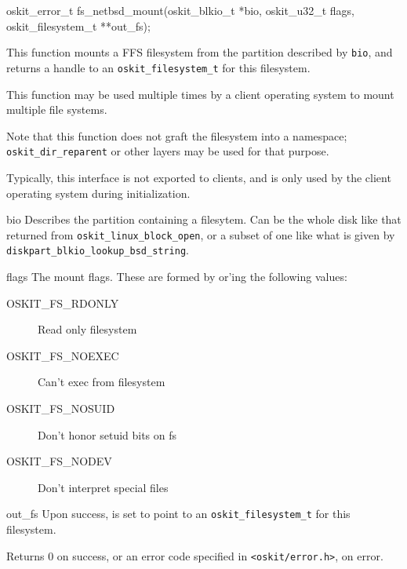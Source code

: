 \begin{apisyn}

	\funcproto oskit_error_t fs_netbsd_mount(oskit_blkio_t *bio,
						 oskit_u32_t flags,
						 oskit_filesystem_t **out_fs);
\end{apisyn}
\ostofs
\begin{apidesc}
        This function mounts a FFS filesystem from the partition
	described by \texttt{bio},
        and returns a handle to an \texttt{oskit_filesystem_t} for
        this filesystem.

	This function may be used multiple times by a client
	operating system to mount multiple file systems.

	Note that this function does not graft the filesystem
	into a namespace;  {\tt oskit_dir_reparent} or other layers
	may be used for that purpose.

	Typically, this interface is not exported to clients,
	and is only used by the client operating system
	during initialization.
\end{apidesc}
\begin{apiparm}
        \item[bio]
              Describes the partition containing a filesytem.
              Can be the whole disk like that returned from
              \texttt{oskit_linux_block_open},
              or a subset of one like what is given by
              \texttt{diskpart_blkio_lookup_bsd_string}.

        \item[flags]
              The mount flags.
              These are formed by or'ing the following values:
              \begin{description}
                \item[OSKIT_FS_RDONLY] Read only filesystem
                \item[OSKIT_FS_NOEXEC] Can't exec from filesystem
                \item[OSKIT_FS_NOSUID] Don't honor setuid bits on fs
                \item[OSKIT_FS_NODEV]  Don't interpret special files
              \end{description}

        \item[out_fs]
              Upon success, is set to point to an \texttt{oskit_filesystem_t}
              for this filesystem.
\end{apiparm}
\begin{apiret}
	Returns 0 on success, or an error code specified in
	{\tt <oskit/error.h>}, on error.
\end{apiret}
